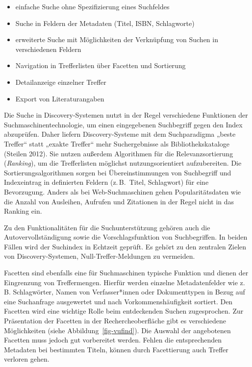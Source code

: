 \documentclass[
  11pt,
  letterpaper,
  DIV=11,
  twoside]{scrreprt}
\begin{document}
\begin{itemize}
\item
  einfache Suche ohne Spezifizierung eines Suchfeldes
\item
  Suche in Feldern der Metadaten (Titel, ISBN, Schlagworte)
\item
  erweiterte Suche mit Möglichkeiten der Verknüpfung von Suchen in
  verschiedenen Feldern
\item
  Navigation in Trefferlisten über Facetten und Sortierung
\item
  Detailanzeige einzelner Treffer
\item
  Export von Literaturangaben
\end{itemize}

Die Suche in Discovery-Systemen nutzt in der Regel verschiedene
Funktionen der Suchmaschinentechnologie, um einen eingegebenen
Suchbegriff gegen den Index abzuprüfen. Daher liefern Discovery-Systeme
mit dem Suchparadigma „beste Treffer`` statt „exakte Treffer`` mehr
Suchergebnisse als Bibliothekskataloge (Steilen 2012). Sie nutzen
außerdem Algorithmen für die Relevanzsortierung (\emph{Ranking}), um die
Trefferlisten möglichst nutzungsorientiert aufzubereiten. Die
Sortierungsalgorithmen sorgen bei Übereinstimmungen von Suchbegriff und
Indexeintrag in definierten Feldern (z.\,B.~Titel, Schlagwort) für eine
Bevorzugung. Anders als bei Web-Suchmaschinen gehen Popularitätsdaten
wie die Anzahl von Ausleihen, Aufrufen und Zitationen in der Regel nicht
in das Ranking ein.

Zu den Funktionalitäten für die Suchunterstützung gehören auch die
Autovervollständigung sowie die Vorschlagsfunktion von Suchbegriffen. In
beiden Fällen wird der Suchindex in Echtzeit geprüft. Es gehört zu den
zentralen Zielen von Discovery-Systemen, Null-Treffer-Meldungen zu
vermeiden.

Facetten sind ebenfalls eine für Suchmaschinen typische Funktion und
dienen der Eingrenzung von Treffermengen. Hierfür werden einzelne
Metadatenfelder wie z.\,B. Schlagwörter, Namen von Verfasser*innen oder
Dokumenttypen in Bezug auf eine Suchanfrage ausgewertet und nach
Vorkommenshäufigkeit sortiert. Den Facetten wird eine wichtige Rolle
beim entdeckenden Suchen zugesprochen. Zur Präsentation der Facetten in
der Rechercheoberfläche gibt es verschiedene Möglichkeiten (siehe
Abbildung~\ref{fig-vufind}). Die Auswahl der angebotenen Facetten muss
jedoch gut vorbereitet werden. Fehlen die entsprechenden Metadaten bei
bestimmten Titeln, können durch Facettierung auch Treffer verloren
gehen.
\end{document}
